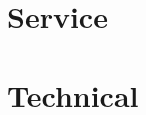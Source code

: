 \documentclass[letterpaper, 10.5pt, sans]{moderncv}
\begin{document}








% 

\vspace{-5pt}
\section{Service}









\vspace{-5pt}
\section{Technical}

\vspace{-5pt}


\end{document}
